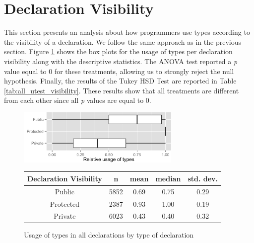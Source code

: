 \documentclass[msc]{ppgccufmg}
\renewcommand{\arraystretch}{1.2}
\begin{document}
\section{Declaration Visibility\label{sec:results-visibility}}

This section presents an analysis about how programmers use types according to the visibility of a declaration.
We follow the same approach as in the previous section.
Figure \ref{fig:all_boxplot_visibility_all} shows the box plots for the usage of types per declaration visibility along with the descriptive statistics.
The ANOVA test reported a \emph{p} value equal to 0 for these treatments, allowing us to strongly reject the null hypothesis.
Finally, the results of the Tukey HSD Test are reported in Table \ref{tab:all_utest_visibility}.
These results show that all treatments are different from each other since all \emph{p} values are equal to 0.


\begin{figure}[h!]
\centering 
\includegraphics[width=0.7\textwidth]{../aosd_2014/analysis/result/all/boxplots/23_declarations_by_visibility.png} 


\vspace{0.3cm}

\renewcommand{\arraystretch}{1.2}

\begin{tabular}{|c|c|c|c|c|}
\hline
Declaration Visibility	& n		& mean	& median	& std. dev.	\\
\hline
\hline
Public    				& 5852	& 0.69	& 0.75		& 0.29		\\ \hline
Protected 				& 2387	& 0.93	& 1.00		& 0.19		\\ \hline
Private   				& 6023	& 0.43	& 0.40		& 0.32		\\ \hline
\end{tabular}
\caption{Usage of types in all declarations by type of declaration}
\label{fig:all_boxplot_visibility_all} 
\end{figure}
\end{document}
